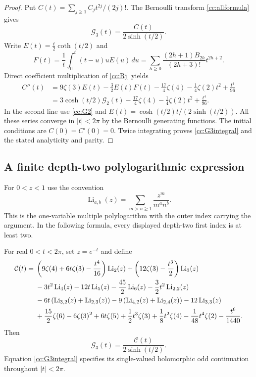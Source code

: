 \begin{proof}
Put $C(t)=\sum_{j\ge1}C_jt^{2j}/(2j)!$.
The Bernoulli transform \eqref{cc:allformula} gives
\[
 \mathcal G_3(t)=\frac{C(t)}{2\sinh(t/2)}.
\]
Write $E(t)=\tfrac t2\coth(t/2)$ and
\[
 F(t)=\frac1t\int_0^t(t-u)uE(u)\,du
     =\sum_{h\ge0}\frac{(2h+1)B_{2h}}{(2h+3)!}t^{2h+2}.
\]
Direct coefficient multiplication of \eqref{cc:Rj} yields
\begin{align*}
 C''(t)
 &=9\zeta(3)E(t)-\frac32E(t)F(t)
          -\frac{17}{4}\zeta(4)-\frac14\zeta(2)t^2+\frac{t^4}{96}\\
 &=3\cosh(t/2)\mathcal G_2(t)
          -\frac{17}{4}\zeta(4)-\frac14\zeta(2)t^2+\frac{t^4}{96}.
\end{align*}
In the second line use \eqref{cc:G2} and
$E(t)=\cosh(t/2)t/(2\sinh(t/2))$.
All these series converge in $|t|<2\pi$ by the Bernoulli generating
functions.  The initial conditions are $C(0)=C'(0)=0$.
Twice integrating proves \eqref{cc:G3integral} and the stated
analyticity and parity.
\end{proof}

\subsection{A finite depth-two polylogarithmic expression}

For $0<z<1$ use the convention
\[
 \operatorname{Li}_{a,b}(z)
   =\sum_{m>n\ge1}\frac{z^m}{m^a n^b}.
\]
This is the one-variable multiple polylogarithm with the outer index
carrying the argument.  In the following formula, every displayed
depth-two first index is at least two.

\begin{theorem}
\label{cc:polylog}
For real $0<t<2\pi$, set $z=e^{-t}$ and define
\begin{align}
 \mathcal C(t)={}&
 \left(9\zeta(4)+6t\zeta(3)-\frac{t^4}{16}\right)
           \operatorname{Li}_2(z)
 +\left(12\zeta(3)-\frac{t^3}{2}\right)\operatorname{Li}_3(z)
       \notag\\
 &-3t^2\operatorname{Li}_4(z)-12t\operatorname{Li}_5(z)
       -\frac{45}{2}\operatorname{Li}_6(z)
       -\frac32t^2\operatorname{Li}_{2,2}(z)
       \notag\\
 &-6t\left(\operatorname{Li}_{3,2}(z)+\operatorname{Li}_{2,3}(z)\right)
       -9\left(\operatorname{Li}_{4,2}(z)+\operatorname{Li}_{2,4}(z)\right)
       -12\operatorname{Li}_{3,3}(z)
       \notag\\
 &+\frac{15}{2}\zeta(6)-6\zeta(3)^2+6t\zeta(5)
       +\frac12t^3\zeta(3)+\frac18t^2\zeta(4)
       -\frac1{48}t^4\zeta(2)-\frac{t^6}{1440}.
       \label{cc:Cpolylog}
\end{align}
Then
\begin{equation}\label{cc:G3polylog}
 \mathcal G_3(t)=\frac{\mathcal C(t)}{2\sinh(t/2)}.
\end{equation}
Equation \eqref{cc:G3integral} specifies its single-valued holomorphic
odd continuation throughout $|t|<2\pi$.
\end{theorem}


